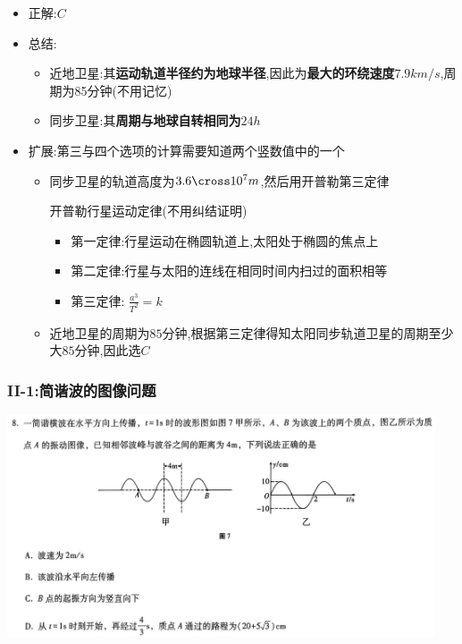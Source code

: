 \documentclass{article}
\begin{document}
\begin{itemize}
    \item 正解:\quad $C$
    \item 总结:\quad
          \begin{itemize}
              \item 近地卫星:其\textbf{运动轨道半径约为地球半径},因此为\textbf{最大的环绕速度$7.9km/s$},周期为85分钟(不用记忆)
              \item 同步卫星:其\textbf{周期与地球自转相同为$24h$}
          \end{itemize}
    \item 扩展:第三与四个选项的计算需要知道两个竖数值中的一个
          \begin{itemize}
              \item 同步卫星的轨道高度为$3.6 \cross 10^{7} m$,然后用开普勒第三定律
                    \begin{thm*}
                        开普勒行星运动定律(不用纠结证明)
                        \begin{itemize}
                            \item 第一定律:行星运动在椭圆轨道上,太阳处于椭圆的焦点上
                            \item 第二定律:行星与太阳的连线在相同时间内扫过的面积相等
                            \item 第三定律: $\frac{a^{3}}{T^{2}} = k$
                        \end{itemize}
                    \end{thm*}
              \item 近地卫星的周期为$85$分钟,根据第三定律得知太阳同步轨道卫星的周期至少大$85$分钟,因此选$C$
          \end{itemize}
\end{itemize}

\vspace{2em}

\subsubsection{II-1:简谐波的图像问题}
\includegraphics[width=0.95\textwidth,keepaspectratio]{./pictures/3.1-2.png}
\end{document}
